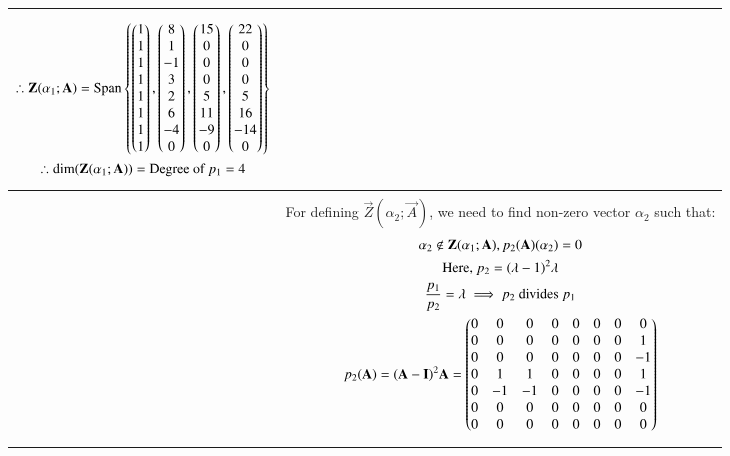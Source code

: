 \begin{longtable}{|p{4cm}|p{14cm}|}
\begin{gather}
         \therefore \mathbf{Z}(\alpha_1;\mathbf{A})=\text{Span}\left\{\begin{pmatrix}1\\1\\1\\1\\1\\1\\1\\1\end{pmatrix},\begin{pmatrix}8\\1\\-1\\3\\2\\6\\-4\\0\end{pmatrix},\begin{pmatrix}15\\0\\0\\0\\5\\11\\-9\\0\end{pmatrix},\begin{pmatrix}22\\0\\0\\0\\5\\16\\-14\\0\end{pmatrix}\right\}\\
        \therefore \text{dim}(\mathbf{Z}(\alpha_1;\mathbf{A}))= \text{Degree of $p_1$}=4
        \end{gather}\\
        \hline
        &\\
        &For defining $\vec{Z}(\alpha_2;\vec{A})$, we need to find non-zero vector $\alpha_2$ such that: 
        \begin{gather}
        \alpha_2 \notin \mathbf{Z}(\alpha_1;\mathbf{A}),p_2(\mathbf{A})(\alpha_2)=0 \label{eq:solutions/7/4/5/eq58}\\
        \text{Here, }p_2=(\lambda-1)^2\lambda \\
        \frac{p_1}{p_2}=\lambda \implies p_2 \text{ divides }p_1 \\
        p_2(\mathbf{A})=(\mathbf{A}-\mathbf{I})^2\mathbf{A}=\begin{pmatrix} 0&  0&  0& 0& 0& 0& 0&  0\\
 0&  0&  0& 0& 0& 0& 0&  1\\
 0&  0&  0& 0& 0& 0& 0& -1\\
 0&  1&  1& 0& 0& 0& 0&  1\\
 0& -1& -1& 0& 0& 0& 0& -1\\
 0&  0&  0& 0& 0& 0& 0&  0\\
 0&  0&  0& 0& 0& 0& 0&  0\\
\end{pmatrix}
\end{gather}
\end{longtable}
